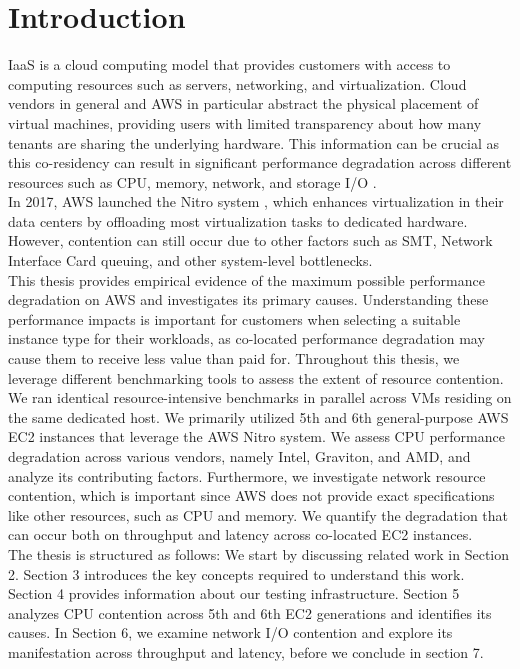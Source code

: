 \chapter{Introduction}\label{chapter:introduction}

\ac{IaaS} is a cloud computing model that provides customers with access to computing 
resources such as servers, networking, and virtualization. Cloud vendors in general and \ac{AWS} in 
particular abstract the physical placement of virtual machines, providing users with limited 
transparency about how many tenants are sharing the underlying hardware. This information can be crucial as 
this co-residency can result in significant performance degradation across different resources such as 
CPU, memory, network, and storage I/O \cite{characterizing_public} \cite{mitigating_resource}. \\
In 2017, \ac{AWS} launched the Nitro system \cite{nitro_whitepaper}, which enhances virtualization 
in their data centers by offloading most virtualization tasks to dedicated hardware.
However, contention can still occur due to other factors such as \ac{SMT}, Network Interface
Card queuing, and other system-level bottlenecks. \\
This thesis provides empirical evidence of the 
maximum possible performance degradation on AWS and investigates its primary causes. Understanding 
these performance impacts is important for customers when selecting a suitable instance type 
for their workloads, as co-located performance degradation may cause them to receive less value 
than paid for. 
Throughout this thesis, we leverage different benchmarking tools to assess the extent of resource 
contention. We ran identical resource-intensive benchmarks 
in parallel across VMs residing on the same dedicated host. We primarily utilized 5th and 6th 
general-purpose \ac{AWS} EC2 instances that leverage the \ac{AWS} Nitro system. We assess
CPU performance degradation across various vendors, namely Intel, Graviton, and AMD, and analyze 
its contributing factors. Furthermore, we investigate network resource 
contention, which is important since \ac{AWS} does not provide exact specifications like other 
resources, such as CPU and memory. We quantify the degradation that can occur both on throughput and 
latency across co-located EC2 instances.\\ 
The thesis is structured as follows: We start by discussing related work in Section 2. 
Section 3 introduces the key concepts required to understand this work.
Section 4 provides information about our testing infrastructure. 
Section 5 analyzes CPU contention across 5th and 6th EC2 generations and identifies its causes. In Section 6, 
we examine network I/O contention and explore its manifestation across throughput and latency, 
before we conclude in section 7. 


